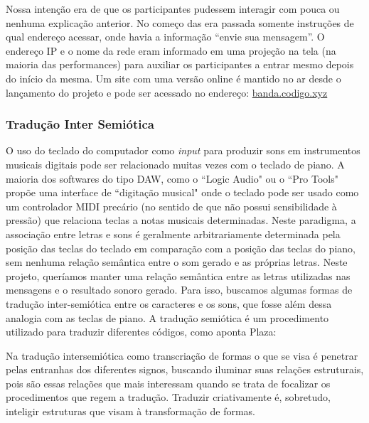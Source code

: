 Nossa intenção era de que os participantes pudessem interagir com pouca ou nenhuma explicação anterior. No começo das era passada somente instruções de qual endereço acessar, onde havia a informação ``envie sua mensagem''. O endereço IP e o nome da rede eram informado em uma projeção na tela (na maioria das performances) para auxiliar os participantes a entrar mesmo depois do início da mesma. Um site com uma versão online é mantido no ar desde o lançamento do projeto e pode ser acessado no endereço: \url{banda.codigo.xyz}




\subsubsection{Tradução Inter Semiótica}
\label{sec:trad}

O uso do teclado do computador como \emph{input} para produzir sons em instrumentos musicais digitais pode ser relacionado muitas vezes com o teclado de piano. A maioria dos softwares do tipo DAW, como o ``Logic Audio" ou o ``Pro Tools" propõe uma interface de ``digitação musical" onde o teclado pode ser usado como um controlador MIDI precário (no sentido de que não possui sensibilidade à pressão) que relaciona teclas a notas musicais determinadas. Neste paradigma, a associação entre letras e sons é geralmente arbitrariamente determinada pela posição das teclas do teclado em comparação com a posição das teclas do piano, sem nenhuma relação semântica entre o som gerado e as próprias letras. Neste projeto, queríamos manter uma relação semântica entre as letras utilizadas nas mensagens e o resultado sonoro gerado. Para isso, buscamos algumas formas de tradução inter-semiótica entre os caracteres e os sons, que fosse além dessa analogia com as teclas de piano. A tradução semiótica é um procedimento utilizado para traduzir diferentes códigos, como aponta Plaza: 

\begin{citacao}
Na tradução intersemiótica como transcriação de formas o que se visa é penetrar pelas entranhas dos diferentes signos, buscando iluminar suas relações estruturais, pois são essas relações que mais interessam quando se trata de focalizar os procedimentos que regem a tradução. Traduzir criativamente é, sobretudo, inteligir estruturas que visam à transformação de formas. \cite[71]{JulioPlaza1969}
\end{citacao}

